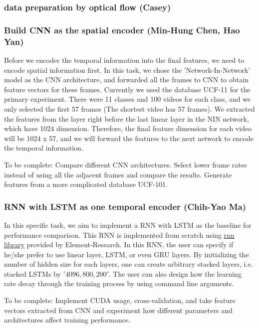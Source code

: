 \subsubsection*{data preparation by optical flow (Casey)}

\subsubsection*{Build CNN as the spatial encoder (Min-Hung Chen, Hao Yan)}
Before we encoder the temporal information into the final features, we need to encode spatial information first. In this task, we chose the 'Network-In-Network'~\cite{nin} model as the CNN architecture, and forwarded all the frames to CNN to obtain feature vectors for these frames. Currently we used the database UCF-11 for the primary experiment. There were 11 classes and 100 videos for each class, and we only selected the first 57 frames (The shortest video has 57 frames). We extracted the features from the layer right before the last linear layer in the NIN network, which have 1024 dimension. Therefore, the final feature dimension for each video will be 1024 x 57, and we will forward the features to the next network to encode the temporal information.

To be complete: Compare different CNN architectures. Select lower frame rates instead of using all the adjacent frames and compare the results. Generate features from a more complicated database UCF-101.

\subsubsection*{RNN with LSTM as one temporal encoder (Chih-Yao Ma)}
In this specific task, we aim to implement a RNN with LSTM as the baseline for performance comparison. This RNN is implemented from scratch using \href{https://github.com/Element-Research/rnn}{rnn library} provided by Element-Research. In this RNN, the user can specify if he/she prefer to use linear layer, LSTM, or even GRU layers. By initializing the number of hidden size for each layers, one can create arbitrary stacked layers, i.e. stacked LSTMs by ${'4096, 800, 200'}$. The user can also design how the learning rate decay through the training process by using command line arguments. 

To be complete: Implement CUDA usage, cross-validation, and take feature vectors extracted from CNN and experiment how different parameters and architectures affect training performance. 

